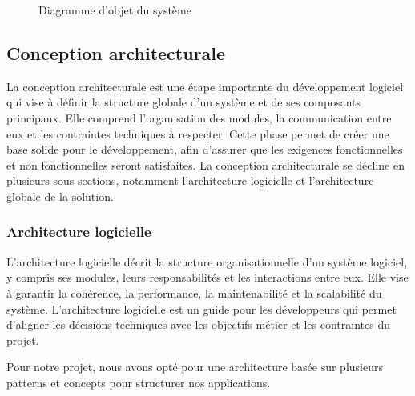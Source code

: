 \begin{figure}[htbp]
    \caption{Diagramme d'objet du système}
\end{figure}


\newpage
\subsection{Conception architecturale}
La conception architecturale est une étape importante du développement logiciel
qui vise à définir la structure globale d’un système et de ses composants
principaux. Elle comprend l’organisation des modules, la communication entre
eux et les contraintes techniques à respecter. Cette phase permet de créer une
base solide pour le développement, afin d’assurer que les exigences
fonctionnelles et non fonctionnelles seront satisfaites. La conception
architecturale se décline en plusieurs sous-sections, notamment l’architecture
logicielle et l’architecture globale de la solution.

\subsubsection{Architecture logicielle}
L’architecture logicielle décrit la structure organisationnelle d’un système
logiciel, y compris ses modules, leurs responsabilités et les interactions
entre eux. Elle vise à garantir la cohérence, la performance, la maintenabilité
et la scalabilité du système. L’architecture logicielle est un guide pour les
développeurs qui permet d’aligner les décisions techniques avec les objectifs
métier et les contraintes du projet.

Pour notre projet, nous avons opté pour une architecture basée sur plusieurs
patterns et concepts pour structurer nos applications.

